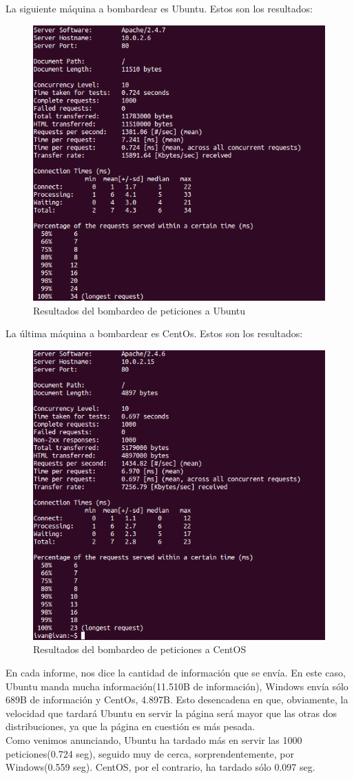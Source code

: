 \begin{itemize}
	La siguiente máquina a bombardear es Ubuntu. Estos son los resultados:\\
	\begin{figure}[H]
		\centering
		\includegraphics[width=0.6\linewidth]{Ubuntu-ab}
		\caption[Ubuntu-ab]{Resultados del bombardeo de peticiones a Ubuntu}
		\label{fig:Ubuntu-ab}
	\end{figure}
	La última máquina a bombardear es CentOs. Estos son los resultados:\\
	\begin{figure}[H]
		\centering
		\includegraphics[width=0.6\linewidth]{CentOS-ab}
		\caption[CentOS ab]{Resultados del bombardeo de peticiones a CentOS}
		\label{fig:Centos-ab}
	\end{figure}
	
	En cada informe, nos dice la cantidad de información que se envía. En este caso, Ubuntu manda mucha información(11.510B de información), Windows envía sólo 689B de información y CentOs, 4.897B. Esto desencadena en que, obviamente, la velocidad que tardará Ubuntu en servir la página será mayor que las otras dos distribuciones, ya que la página en cuestión es más pesada.\\
	Como venimos anunciando, Ubuntu ha tardado más en servir las 1000 peticiones(0.724 seg), seguido muy de cerca, sorprendentemente, por Windows(0.559 seg). CentOS, por el contrario, ha tardado sólo 0.097 seg.\\
	
	
\end{itemize}

